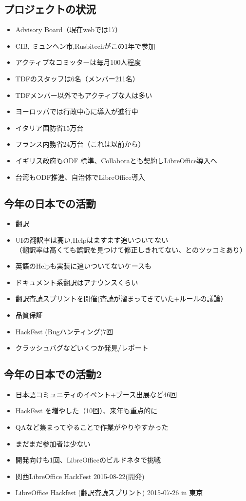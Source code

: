 \documentclass[mingoth,a4paper]{jsarticle}
\begin{document}
\subsection{プロジェクトの状況}
\begin{itemize}
\item %
Advisory Board（現在webでは17）
\item %
CIB, ミュンヘン市,Rusbitechがこの1年で参加
\item %
アクティブなコミッターは毎月100人程度
\item %
TDFのスタッフは6名（メンバー211名）
\item %
TDFメンバー以外でもアクティブな人は多い
\item %
ヨーロッパでは行政中心に導入が進行中
\item %
イタリア国防省15万台
\item %
フランス内務省24万台（これは以前から）
\item %
イギリス政府もODF 標準、Collaboraとも契約しLibreOffice導入へ
\item %
台湾もODF推進、自治体でLibreOffice導入
\end{itemize}

\subsection{今年の日本での活動}
\begin{itemize}
\item %
翻訳
\item %
UIの翻訳率は高い,Helpはますます追いついてない\\
（翻訳率は高くても誤訳を見つけて修正しきれてない、とのツッコミあり）
\item %
英語のHelpも実装に追いついてないケースも
\item %
ドキュメント系翻訳はアナウンスくらい
\item %
翻訳査読スプリントを開催(査読が溜まってきていた+ルールの議論）
\item %
品質保証
\item %
HackFest (Bugハンティング)7回
\item %
クラッシュバグなどいくつか発見/レポート
\end{itemize}

\subsection{今年の日本での活動2}
\begin{itemize}
\item %
日本語コミュニティのイベント+ブース出展など46回
\item %
HackFest を増やした（10回）、来年も重点的に
\item %
QAなど集まってやることで作業がやりやすかった
\item %
まだまだ参加者は少ない
\item %
開発向けも1回、LibreOfficeのビルドネタで挑戦
\item %
関西LibreOffice HackFest 2015-08-22(開発)
\item %
LibreOffice Hackfest (翻訳査読スプリント) 2015-07-26 in 東京
\end{itemize}
\end{document}
